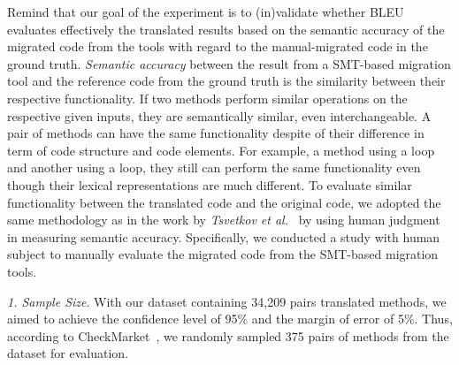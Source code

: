 %
Remind that our goal of the experiment is to (in)validate whether BLEU
evaluates effectively the translated results based on the semantic accuracy 
of the migrated code from the tools with regard to the manual-migrated code 
in the ground truth. 
%
{\em Semantic accuracy} between the result from a SMT-based migration
tool and the reference code from the ground truth is the similarity
between their respective functionality. 
%
If two methods perform similar operations on the respective given
inputs, they are semantically similar, even interchangeable. A pair of
methods can have the same functionality despite of their difference in
term of code structure and code elements.
%
For example, a method using a  loop and another using a
 loop, they still can perform the same functionality even
though their lexical representations are much different. 
%
%
To evaluate similar functionality between the translated code and the
original code, we adopted the same methodology as in the work by {\em
  Tsvetkov et al.}~\cite{tsvetkov-acl15} by using human judgment in
measuring semantic accuracy.
%
%
Specifically, we conducted a study with human subject to manually
evaluate the migrated code from the SMT-based migration tools.


\emph{1. Sample Size}. 
%
With our dataset containing 34,209 pairs translated methods, we aimed
to achieve the confidence level of 95\% and the margin of error of
5\%. Thus, according to CheckMarket~\cite{sample}, we randomly sampled
375 pairs of methods from the dataset for evaluation.

